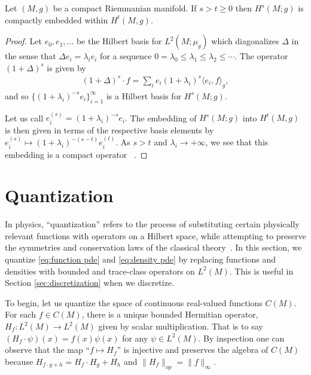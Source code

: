 \documentclass[final,leqno]{siamart}
\begin{document}
\begin{proposition} \label{prop:compact_embedding}
	Let $(M,g)$ be a compact Riemmanian manifold.  If $s > t \geq 0$ then $H^s(M;g)$ is compactly embedded within $H^t(M,g)$.
\end{proposition}
\begin{proof}
	Let $e_0, e_1,\dots$ be the Hilbert basis for $L^2(M;\mu_g)$ which diagonalizes $\Delta$
	in the sense that $\Delta e_i = \lambda_i e_i$ for a sequence $0 = \lambda_0 \leq \lambda_1 \leq \lambda_2 \leq \cdots$.
	The operator $(1+\Delta)^s$ is given by
	\begin{align*}
		(1+\Delta)^s \cdot f =  \sum_{i} e_i (1+\lambda_i)^s \langle e_i , f \rangle_g,
	\end{align*}
	and so $\{ (1+ \lambda_i)^{-s} e_i \}_{i=1}^{\infty}$ is a Hilbert basis for $H^s(M;g)$.
	
	Let us call $e_i^{(s)} = (1+ \lambda_i)^{-s} e_i$.
	The embedding of $H^s(M;g)$ into $H^t(M,g)$
	is then given in terms of the respective basis elements by $e_i^{(s)} \mapsto (1+\lambda_i)^{-(s-t)}e_i^{(t)}$.
	As $s > t$ and $\lambda_i \to +\infty$, we see that 
	this embedding is a compact operator ~\cite[Proposition 4.6]{Conway1990}.
\end{proof}



\section{Quantization} \label{sec:quantization}
In physics, ``quantization'' refers to the process of substituting certain physically relevant functions with operators on a Hilbert space, while attempting to preserve the symmetries and conservation laws of the classical theory~\cite{BatesWeinstein1997,GuilleminSternberg1970}.
In this section, we quantize \eqref{eq:function pde} and \eqref{eq:density pde} by replacing functions and densities with bounded and trace-class operators on $L^{2}(M)$.
This is useful in Section \ref{sec:discretization} when we discretize.

To begin, let us quantize the space of continuous real-valued functions $C(M)$.
For each $f \in C(M)$, there is a unique bounded Hermitian operator, $H_{f} : L^{2}(M) \to L^{2}(M)$ given by scalar multiplication.
That is to say $(H_{f} \cdot \psi) (x) = f(x) \psi(x)$ for any $\psi \in L^{2}(M)$.
By inspection one can observe that the map ``$f \mapsto H_{f}$'' is injective and preserves the algebra of $C(M)$ because $H_{f\cdot g + h} = H_{f} \cdot H_{g} + H_{h}$ and $\| H_{f} \|_{op} = \| f \|_{\infty}$.
\end{document}
